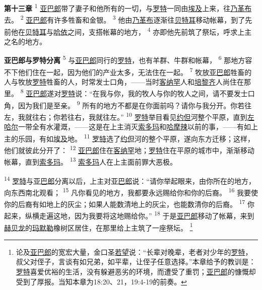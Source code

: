 \textbf{第十三章\quad}
\textsuperscript{1}
\uline{亚巴郎}带了妻子和他所有的一切，与\uline{罗特}一同由\uline{埃及}上来，往\uline{乃革布}去。
\textsuperscript{2}
\uline{亚巴郎}有许多牲畜和金银。
\textsuperscript{3}
他由\uline{乃革布}逐渐往\uline{贝特耳}移动帐幕，到了先前他在\uline{贝特耳}与\uline{哈依}之间，支搭帐幕的地方，
\textsuperscript{4}
亦即他先前筑了祭坛，呼求上主之名的地方。

\textbf{亚巴郎与罗特分离\quad}
\textsuperscript{5}
与\uline{亚巴郎}同行的\uline{罗特}，也有羊群、牛群和帐幕，
\textsuperscript{6}
那地方容不下他们住在一起，因为他们的产业太多，无法住在一起。
\textsuperscript{7}
牧放\uline{亚巴郎}牲畜的人与牧放\uline{罗特}牲畜的人，时常发士口角，——当时\uline{客纳罕}人和\uline{培黎齐}人尚住在那里。
\textsuperscript{8}
\uline{亚巴郎}遂对\uline{罗特}说：“在我与你，我的牧人与你的牧人之间，请不要发士口角，因为我们是至亲。
\textsuperscript{9}
所有的地方不都是在你面前吗？请你与我分开。你若往左，我就往右；你若往右，我就往左。”
\textsuperscript{10}
\uline{罗特}举目看见\uline{约但}河整个平原，直到\uline{左哈尔}一带全有水灌溉，——这是在上主消灭\uline{索多玛}和\uline{哈摩辣}以前的事，——有如上主的乐园，有如\uline{埃及}地。
\textsuperscript{11}
\uline{罗特}选了\uline{约但}河的整个平原，遂向东方迁移；这样，他们就彼此分开了：
\textsuperscript{12}
\uline{亚巴郎}住在\uline{客纳罕}地；\uline{罗特}住在平原的城市中，渐渐移动帐幕，直到\uline{索多玛}。
\textsuperscript{13}
\uline{索多玛}人在上主面前罪大恶极。

\textsuperscript{14}
\uline{罗特}与\uline{亚巴郎}分离以后，上主对\uline{亚巴郎}说：“请你举起眼来，由你所在的地方，向东西南北观看；
\textsuperscript{15}
凡你看见的地方，我都要永远赐给你和你的后裔。
\textsuperscript{16}
我要使你的后裔有如地上的灰尘；如果人能数清地上的灰尘，也能数清你的后裔。
\textsuperscript{17}
你起来，纵横走遍这地，因为我要将这地赐给你。”
\textsuperscript{18}
于是\uline{亚巴郎}移动了帐幕，来到\uline{赫贝龙}的\uline{玛默勒}橡树区居住，在那里给上主筑了一座祭坛。
\footnote{论及\uline{亚巴郎}的宽宏大量，金口圣\uline{若望}说：“长辈对晚辈，老者对少年的\uline{罗特}，叔父对侄子，言谈有如兄弟，如平辈，让侄子任意选择。”本章给予的教训是：\uline{罗特}喜爱优裕的生活，没有躲避恶劣的环境，而遭受了重罚；\uline{亚巴郎}的慷慨却受到了厚报。当知本章为18:20、21，19:4-19的前奏。}

